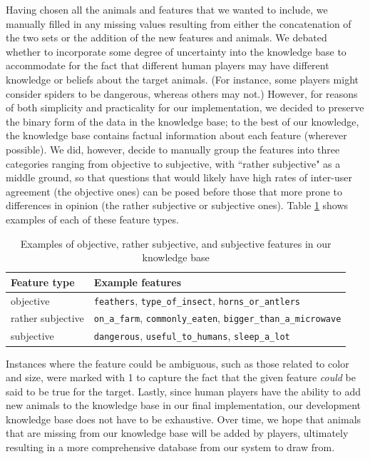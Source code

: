 \documentclass[11pt,a4paper]{article}
\begin{document}
Having chosen all the animals and features that we wanted to include, we manually filled in any missing values resulting from either the concatenation of the two sets or the addition of the new features and animals. 
We debated whether to incorporate some degree of uncertainty into the knowledge base to accommodate for the fact that different human players may have different knowledge or beliefs about the target animals. 
(For instance, some players might consider spiders to be dangerous, whereas others may not.) 
However, for reasons of both simplicity and practicality for our implementation, we decided to preserve the binary form of the data in the knowledge base; to the best of our knowledge, the knowledge base contains factual information about each feature (wherever possible). 
We did, however, decide to manually group the features into three categories ranging from objective to subjective, with ``rather subjective" as a middle ground, so that questions that would likely have high rates of inter-user agreement (the objective ones) can be posed before those that more prone to differences in opinion (the rather subjective or subjective ones). 
Table \ref{tab:feature-types} shows examples of each of these feature types.

\begin{table}
    \centering
    \begin{tabular}{ll}
    \toprule
    Feature type & Example features \\ 
    \midrule
         objective &  \texttt{feathers}, \texttt{type\_of\_insect}, \texttt{horns\_or\_antlers} \\
         rather subjective & \texttt{on\_a\_farm}, \texttt{commonly\_eaten}, \texttt{bigger\_than\_a\_microwave} \\
         subjective & \texttt{dangerous}, \texttt{useful\_to\_humans}, \texttt{sleep\_a\_lot}\\
    \bottomrule
    \end{tabular}
    \caption{Examples of objective, rather subjective, and subjective features in our knowledge base}
    \label{tab:feature-types}
\end{table}

Instances where the feature could be ambiguous, such as those related to color and size, were marked with 1 to capture the fact that the given feature \textit{could} be said to be true for the target.
Lastly, since human players have the ability to add new animals to the knowledge base in our final implementation, our development knowledge base does not have to be exhaustive. 
Over time, we hope that animals that are missing from our knowledge base will be added by players, ultimately resulting in a more comprehensive database from our system to draw from.
\end{document}
